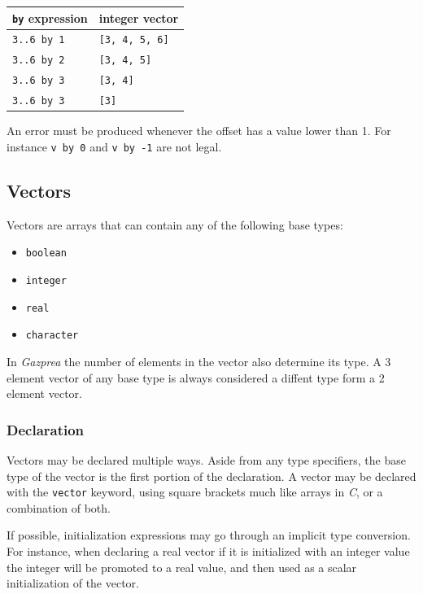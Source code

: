 \documentclass{article}
\begin{document}
		\begin{center}
			\begin{tabular}{|l|l|}
			\hline
			\textbf{\texttt{by} expression} & \textbf{integer vector} \\
			\hline
			\texttt{3..6 by 1} & \texttt{[3, 4, 5, 6]} \\
			\texttt{3..6 by 2} & \texttt{[3, 4, 5]}    \\
			\texttt{3..6 by 3} & \texttt{[3, 4]}       \\
			\texttt{3..6 by 3} & \texttt{[3]}          \\
			\hline
			\end{tabular}
		\end{center}

		An error must be produced whenever the offset has a value lower than 1. For instance \texttt{v by 0} and
		\texttt{v by -1} are not legal.


	\subsection{Vectors}\label{sec:vector}

		Vectors are arrays that can contain any of the following base types:
		\begin{itemize}
			\item \texttt{boolean}
			\item \texttt{integer}
			\item \texttt{real}
			\item \texttt{character}
		\end{itemize}

		In \textit{Gazprea} the number of elements in the vector also determine its type. A 3 element vector of any base
		type is always considered a diffent type form a 2 element vector.

		\subsubsection{Declaration}

			Vectors may be declared multiple ways. Aside from any type specifiers, the base type of the vector is the
			first portion of the declaration. A vector may be declared with the \texttt{vector} keyword, using square
			brackets much like arrays in \textit{C}, or a combination of both.

			If possible, initialization expressions may go through an implicit type conversion. For instance, when
			declaring a real vector if it is initialized with an integer value the integer will be promoted to a real
			value, and then used as a scalar initialization of the vector.
\end{document}
